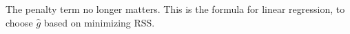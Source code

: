 \documentclass[10pt]{article}
\begin{document}
The penalty term no longer matters. This is the formula for linear regression, to choose $\hat{g}$ based on minimizing RSS.
\end{document}
